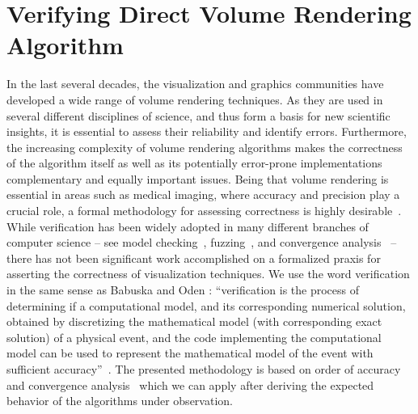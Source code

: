 \chapter{Verifying Direct Volume Rendering Algorithm}
\label{chap:vr}

In the last several decades, the visualization and graphics communities have developed a wide range of volume rendering techniques. As they are used in several different disciplines of science, and thus form a basis for new scientific insights, it is essential to assess their reliability and identify errors. Furthermore, the increasing complexity of volume rendering algorithms makes the correctness of the algorithm itself as well as its potentially error-prone implementations complementary and equally important issues.  Being that volume rendering is essential in areas such as medical imaging, where accuracy and precision play a crucial role, a formal methodology for assessing correctness is highly desirable~\cite{kirby-vv-08, Pommert2002}. While verification has been widely adopted in many different branches of computer science -- see  model checking~\cite{Clarke08}, fuzzing~\cite{godefroid08}, and convergence analysis~\cite{Roy2005} -- there has not been significant work accomplished on a formalized praxis for asserting the correctness of visualization techniques. 
We use the word verification in the same sense as Babuska and Oden \cite{babuska04}: ``verification is the process of determining if a computational model, and its corresponding numerical solution, obtained by discretizing the mathematical model (with corresponding exact solution) of a physical event, and the code implementing the computational model can be used to represent the mathematical model of the event with sufficient accuracy''~\cite{babuska04}. 
The presented methodology is based on order of accuracy and convergence analysis~\cite{Roy2005} which we can apply after deriving the expected behavior of the algorithms under observation. 

